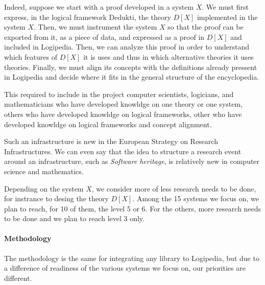 Indeed, suppose we start with a proof developed in a system $X$. We
must first express, in the logical framework {\sc Dedukti}, the theory
$D[X]$ implemented in the system $X$. Then, we must instrument the
system $X$ so that the proof can be exported from it, as a piece of
data, and expressed as a proof in $D[X]$ and included in {\sc
Logipedia}.  Then, we can analyze this proof in order to understand
which features of $D[X]$ it is uses and thus in which alternative
theories it uses theories.  Finally, we must align its concepts with
the definitions already pressent in {\sc Logipedia} and decide where
it fits in the general structure of the encyclopedia.

This required to include in the project computer scientists,
logicians, and mathematicians who have developed knowldge on one
theory or one system, others who have developed knowldge on logical
frameworks, other who have developed knowldge on logical frameworks
and concept alignment.

Such an infrastructure is new in the European Strategy on Research
Infrastructures. We can even say that the idea to structure a research
event around an infrastructure, such as {\em Software heritage}, is
relatively new in computer science and mathematics.

Depending on the system $X$, we consider more of less research needs
to be done, for instrance to desing the theory $D[X]$. Among the 15
systems we focus on, we plan to reach, for 10 of them, the level 5 or
6. For the others, more research needs to be done and we plan to reach
level 3 only.

\paragraph{Methodology}

The methodology is the same for integrating any library to {\sc Logipedia},
but due to a difference of readiness of the various systems we focus on,
our priorities are different.

